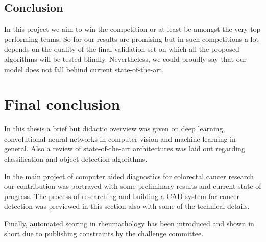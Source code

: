 \documentclass[a4paper,12pt]{article}
\begin{document}
\subsection{Conclusion}

\vspace{4mm}

\par In this project we aim to win the competition or at least be amongst the very top performing teams. So for our results are promising but in such competitions a lot depends on the quality of the final validation set on which all the proposed algorithms will be tested blindly. Nevertheless, we could proudly say that our model does not fall behind current state-of-the-art.

\newpage

\section{Final conclusion}

\vspace{4mm}

\par In this thesis a brief but didactic overview was given on deep learning, convolutional neural networks in computer vision and machine learning in general. Also a review of state-of-the-art architectures was laid out regarding classification and object detection algorithms.

\vspace{4mm}

\par In the main project of computer aided diagnostics for colorectal cancer research our contribution was portrayed with some preliminary results and current state of progress. The process of researching and building a CAD system for cancer detection was previewed in this section also with some of the technical details.

\vspace{4mm}

\par Finally, automated scoring in rheumathology has been introduced and shown in short due to publishing constraints by the challenge committee.

\newpage



\end{document}
